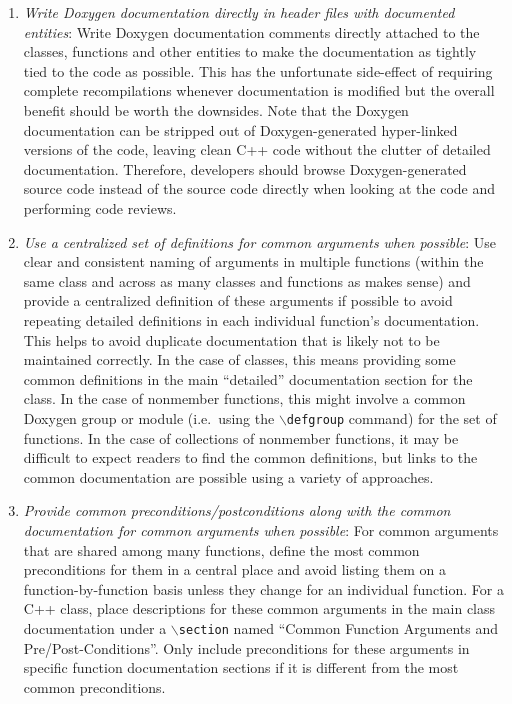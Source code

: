 \begin{enumerate}

{}\item\textit{Write Doxygen documentation directly in header files with
documented entities}: Write Doxygen documentation comments directly attached
to the classes, functions and other entities to make the documentation as
tightly tied to the code as possible.  This has the unfortunate side-effect of
requiring complete recompilations whenever documentation is modified but the
overall benefit should be worth the downsides.  Note that the Doxygen
documentation can be stripped out of Doxygen-generated hyper-linked versions
of the code, leaving clean C++ code without the clutter of detailed
documentation.  Therefore, developers should browse Doxygen-generated source
code instead of the source code directly when looking at the code and
performing code reviews.

{}\item\textit{Use a centralized set of definitions for common arguments when
possible}: Use clear and consistent naming of arguments in multiple functions
(within the same class and across as many classes and functions as makes
sense) and provide a centralized definition of these arguments if possible to
avoid repeating detailed definitions in each individual function's
documentation.  This helps to avoid duplicate documentation that is likely not
to be maintained correctly.  In the case of classes, this means providing some
common definitions in the main ``detailed'' documentation section for the
class.  In the case of nonmember functions, this might involve a common
Doxygen group or module (i.e.\ using the {}\texttt{$\backslash$defgroup}
command) for the set of functions.  In the case of collections of nonmember
functions, it may be difficult to expect readers to find the common
definitions, but links to the common documentation are possible using a
variety of approaches.

{}\item\textit{Provide common preconditions/postconditions along with the
common documentation for common arguments when possible}: For common arguments
that are shared among many functions, define the most common preconditions for
them in a central place and avoid listing them on a function-by-function basis
unless they change for an individual function.  For a C++ class, place
descriptions for these common arguments in the main class documentation under
a {}\texttt{$\backslash$section} named ``Common Function Arguments and
Pre/Post-Conditions''.  Only include preconditions for these arguments in
specific function documentation sections if it is different from the most
common preconditions.


\end{enumerate}
